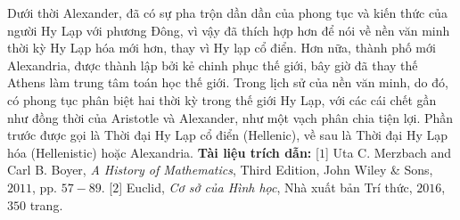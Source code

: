 \begin{multicols}{2}
	Dưới thời Alexander, đã có sự pha trộn dần dần của phong tục và kiến thức của người Hy Lạp  với phương Đông, vì vậy đã thích hợp hơn  để nói về nền văn minh thời kỳ Hy Lạp hóa mới hơn, thay vì Hy lạp cổ điển. 
	\vskip 0.1cm
	Hơn nữa, thành phố mới Alexandria, được thành lập bởi kẻ chinh phục thế giới, bây giờ đã thay thế Athens làm trung tâm toán học thế giới. 
	\vskip 0.1cm
	Trong lịch sử của nền văn minh, do đó, có phong tục phân biệt hai thời kỳ trong thế giới Hy Lạp, với các cái chết gần như đồng thời của Aristotle và Alexander, như một vạch phân chia tiện lợi. Phần trước được gọi là Thời đại Hy Lạp cổ điển (Hellenic), về sau là Thời đại Hy Lạp hóa (Hellenistic) hoặc Alexandria.
	\vskip 0.1cm
	\textbf{\color{lichsutoanhoc}Tài liệu trích dẫn:}
	\vskip 0.1cm
	[$1$] Uta C. Merzbach and Carl B. Boyer, \textit{A
	History of Mathematics}, Third Edition, John Wiley \& Sons, $2011$, pp. $57-89$.
	\vskip 0.1cm
	[$2$]  Euclid, \textit{Cơ sở của Hình học}, Nhà xuất bản Trí thức, $2016$, $350$ trang.
\end{multicols}

